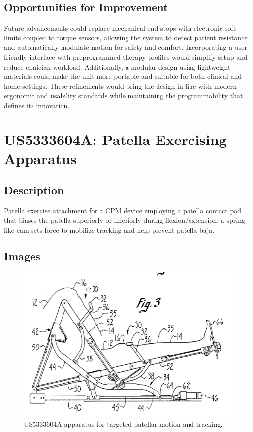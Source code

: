 \documentclass[11pt]{article}
\begin{document}
\subsection{Opportunities for Improvement}
Future advancements could replace mechanical end stops with electronic soft limits coupled to torque sensors, allowing the system to detect patient resistance and automatically modulate motion for safety and comfort. Incorporating a user-friendly interface with preprogrammed therapy profiles would simplify setup and reduce clinician workload. Additionally, a modular design using lightweight materials could make the unit more portable and suitable for both clinical and home settings. These refinements would bring the design in line with modern ergonomic and usability standards while maintaining the programmability that defines its innovation.

\section{US5333604A: Patella Exercising Apparatus}
\subsection{Description}
Patella exercise attachment for a CPM device employing a patella contact pad that biases the patella superiorly or inferiorly during flexion/extension; a spring-like cam sets force to mobilize tracking and help prevent patella baja.
\subsection{Images}
\begin{figure}[H]
  \centering
  \includegraphics[width=0.54\linewidth]{US5333604_1.png}
  \caption{US5333604A apparatus for targeted patellar motion and tracking.}
  \label{fig:US5333604A}
\end{figure}
\end{document}
